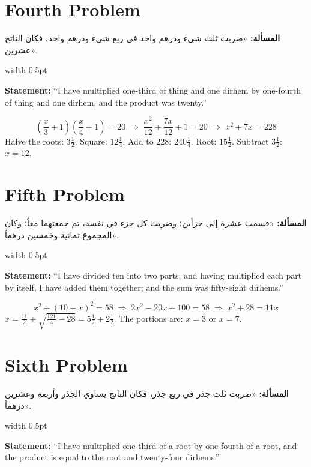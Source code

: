 \documentclass[10pt,a4paper]{book}
\newlength{\colwidth}
\newcommand{\bilingualpair}[2]{%
  \noindent
  \begin{minipage}[t]{\colwidth}
  \begin{flushright}
  \vspace{0pt}
  {\arabicfont\small #1}
  \end{flushright}
  \end{minipage}%
  \hfill\textcolor{columnsepclr}{\vrule width 0.5pt}\hfill
  \begin{minipage}[t]{\colwidth}
  \vspace{0pt}
  {\small #2}
  \end{minipage}%
  \par\vspace{0.6em}
}
\begin{document}
\section*{Fourth Problem}

\bilingualpair{
\textbf{المسألة:} «ضربت ثلث شيء ودرهم واحد في ربع شيء ودرهم
واحد، فكان الناتج عشرين».
}{
\textbf{Statement:} ``I have multiplied one-third of thing and one dirhem by
one-fourth of thing and one dirhem, and the product was twenty.''
}

\begin{mathbox}
\begin{equation}
\left(\frac{x}{3} + 1\right)\left(\frac{x}{4} + 1\right) = 20
\;\Rightarrow\; \frac{x^2}{12} + \frac{7x}{12} + 1 = 20
\;\Rightarrow\; x^2 + 7x = 228
\end{equation}
Halve the roots: $3\frac{1}{2}$. Square: $12\frac{1}{4}$. Add to 228: $240\frac{1}{4}$.
Root: $15\frac{1}{2}$. Subtract $3\frac{1}{2}$: $x = 12$.
\end{mathbox}

\section*{Fifth Problem}

\bilingualpair{
\textbf{المسألة:} «قسمت عشرة إلى جزأين؛ وضربت كل جزء في نفسه،
ثم جمعتهما معاً؛ وكان المجموع ثمانية وخمسين درهماً».
}{
\textbf{Statement:} ``I have divided ten into two parts; and having
multiplied each part by itself, I have added them together; and the sum was
fifty-eight dirhems.''
}

\begin{mathbox}
\begin{equation}
x^2 + (10-x)^2 = 58 \;\Rightarrow\; 2x^2 - 20x + 100 = 58
\;\Rightarrow\; x^2 + 28 = 11x
\end{equation}
$x = \frac{11}{2} \pm \sqrt{\frac{121}{4} - 28} = 5\frac{1}{2} \pm 2\frac{1}{2}$.
The portions are: $x = 3$ or $x = 7$.
\end{mathbox}

\section*{Sixth Problem}

\bilingualpair{
\textbf{المسألة:} «ضربت ثلث جذر في ربع جذر، فكان الناتج يساوي
الجذر وأربعة وعشرين درهماً».
}{
\textbf{Statement:} ``I have multiplied one-third of a root by one-fourth of
a root, and the product is equal to the root and twenty-four dirhems.''
}
\end{document}
